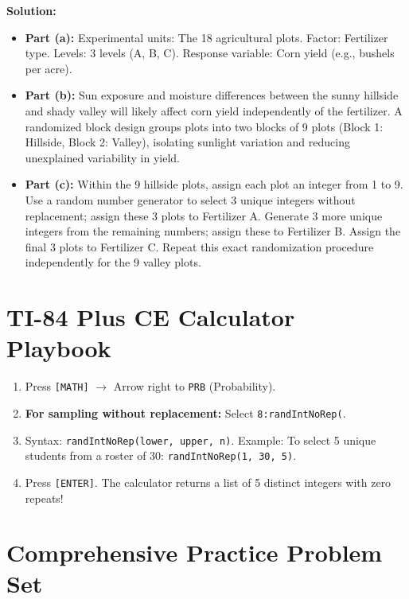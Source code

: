 \textbf{Solution:}
\begin{itemize}[leftmargin=1.2em]
  \item \textbf{Part (a):} Experimental units: The 18 agricultural plots. Factor: Fertilizer type. Levels: 3 levels (A, B, C). Response variable: Corn yield (e.g., bushels per acre).
  \item \textbf{Part (b):} Sun exposure and moisture differences between the sunny hillside and shady valley will likely affect corn yield independently of the fertilizer. A randomized block design groups plots into two blocks of 9 plots (Block 1: Hillside, Block 2: Valley), isolating sunlight variation and reducing unexplained variability in yield.
  \item \textbf{Part (c):} Within the 9 hillside plots, assign each plot an integer from 1 to 9. Use a random number generator to select 3 unique integers without replacement; assign these 3 plots to Fertilizer A. Generate 3 more unique integers from the remaining numbers; assign these to Fertilizer B. Assign the final 3 plots to Fertilizer C. Repeat this exact randomization procedure independently for the 9 valley plots.
\end{itemize}

\section{TI-84 Plus CE Calculator Playbook}

\begin{calculatorbox}
\begin{enumerate}[leftmargin=1.2em]
  \item Press \texttt{[MATH]} $\rightarrow$ Arrow right to \texttt{PRB} (Probability).
  \item \textbf{For sampling without replacement:} Select \texttt{8:randIntNoRep(}.
  \item Syntax: \texttt{randIntNoRep(lower, upper, n)}.
  Example: To select 5 unique students from a roster of 30: \texttt{randIntNoRep(1, 30, 5)}.
  \item Press \texttt{[ENTER]}. The calculator returns a list of 5 distinct integers with zero repeats!
\end{enumerate}
\end{calculatorbox}

\section{Comprehensive Practice Problem Set}

